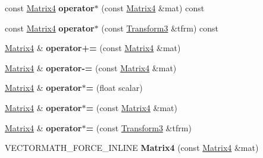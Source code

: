 \begin{DoxyCompactItemize}
const \hyperlink{classVectormath_1_1Aos_1_1Matrix4}{Matrix4} {\bfseries operator$\ast$} (const \hyperlink{classVectormath_1_1Aos_1_1Matrix4}{Matrix4} \&mat) const
\item 
\mbox{\label{classVectormath_1_1Aos_1_1Matrix4_ae991ba8d13e555cdfec93a3aae50029a}} 
const \hyperlink{classVectormath_1_1Aos_1_1Matrix4}{Matrix4} {\bfseries operator$\ast$} (const \hyperlink{classVectormath_1_1Aos_1_1Transform3}{Transform3} \&tfrm) const
\item 
\mbox{\label{classVectormath_1_1Aos_1_1Matrix4_a865d078ab0129afc6da7d8f0ffdc96f0}} 
\hyperlink{classVectormath_1_1Aos_1_1Matrix4}{Matrix4} \& {\bfseries operator+=} (const \hyperlink{classVectormath_1_1Aos_1_1Matrix4}{Matrix4} \&mat)
\item 
\mbox{\label{classVectormath_1_1Aos_1_1Matrix4_aa7d2c8b36904893da4d9c1df8db9d851}} 
\hyperlink{classVectormath_1_1Aos_1_1Matrix4}{Matrix4} \& {\bfseries operator-\/=} (const \hyperlink{classVectormath_1_1Aos_1_1Matrix4}{Matrix4} \&mat)
\item 
\mbox{\label{classVectormath_1_1Aos_1_1Matrix4_a5aab373e0ca5f9e0dccc54271d4fbde3}} 
\hyperlink{classVectormath_1_1Aos_1_1Matrix4}{Matrix4} \& {\bfseries operator$\ast$=} (float scalar)
\item 
\mbox{\label{classVectormath_1_1Aos_1_1Matrix4_ae4155b47e518f43e036b92a17cb93ec4}} 
\hyperlink{classVectormath_1_1Aos_1_1Matrix4}{Matrix4} \& {\bfseries operator$\ast$=} (const \hyperlink{classVectormath_1_1Aos_1_1Matrix4}{Matrix4} \&mat)
\item 
\mbox{\label{classVectormath_1_1Aos_1_1Matrix4_afab4864e33c43c4e610b2ed1041c49be}} 
\hyperlink{classVectormath_1_1Aos_1_1Matrix4}{Matrix4} \& {\bfseries operator$\ast$=} (const \hyperlink{classVectormath_1_1Aos_1_1Transform3}{Transform3} \&tfrm)
\item 
\mbox{\label{classVectormath_1_1Aos_1_1Matrix4_ab1f5a51a2e0d533dd04e1645e9f1f9de}} 
V\+E\+C\+T\+O\+R\+M\+A\+T\+H\+\_\+\+F\+O\+R\+C\+E\+\_\+\+I\+N\+L\+I\+NE {\bfseries Matrix4} (const \hyperlink{classVectormath_1_1Aos_1_1Matrix4}{Matrix4} \&mat)

\end{DoxyCompactItemize}

